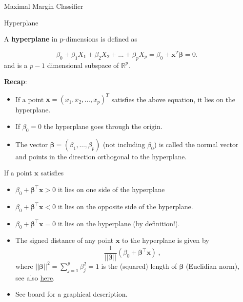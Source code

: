 \documentclass[10pt,ignorenonframetext,]{beamer}
\begin{document}
\begin{frame}{Maximal Margin Classifier}
\protect\hypertarget{maximal-margin-classifier}{}

\begin{block}{Hyperplane}

\vspace{2mm}

A \textbf{hyperplane} in p-dimensions is defined as

\[\beta_0+\beta_1 X_1 + \beta_2 X_2 +...+\beta_p X_p=\beta_0+{\boldsymbol x}^T {\boldsymbol \beta}=0.\]
and is a \(p-1\) dimensional subspace of \(\mathbb{R}^p\).

\vspace{5mm}

\textbf{Recap}:

\begin{itemize}
\item
  If a point \({\boldsymbol x}=(x_1,x_2,...,x_p)^T\) satisfies the above
  equation, it lies on the hyperplane.
\item
  If \(\beta_0=0\) the hyperplane goes through the origin.
\item
  The vector \({\boldsymbol \beta}=(\beta_1, \ldots, \beta_p)\) (not
  including \(\beta_0\)) is called the normal vector and points in the
  direction orthogonal to the hyperplane.
\end{itemize}

\end{block}

\end{frame}

\begin{frame}

If a point \({\boldsymbol x}\) satisfies

\begin{itemize}
\item
  \(\beta_0+ {\boldsymbol \beta}^\top {\boldsymbol x}>0\) it lies on one
  side of the hyperplane
\item
  \(\beta_0+{\boldsymbol \beta}^\top {\boldsymbol x}<0\) it lies on the
  opposite side of the hyperplane.
\item
  \(\beta_0+{\boldsymbol \beta}^\top {\boldsymbol x}=0\) it lies on the
  hyperplane (by definition!).
\end{itemize}

\vspace{2mm}

\begin{itemize}
\item
  The signed distance of any point \(\boldsymbol x\) to the hyperplane
  is given by
  \[\frac{1}{||{\boldsymbol\beta}||} (\beta_0 + {\boldsymbol \beta}^\top {\boldsymbol x} )\ ,\]
  where \(||{\boldsymbol\beta}||^2 = \sum_{j=1}^p \beta_j^2=1\) is the
  (squared) length of \(\boldsymbol \beta\) (Euclidian norm), see also
  \href{https://en.wikipedia.org/wiki/Distance_from_a_point_to_a_plane}{here}.
\item
  See board for a graphical description.
\end{itemize}

\end{frame}
\end{document}
